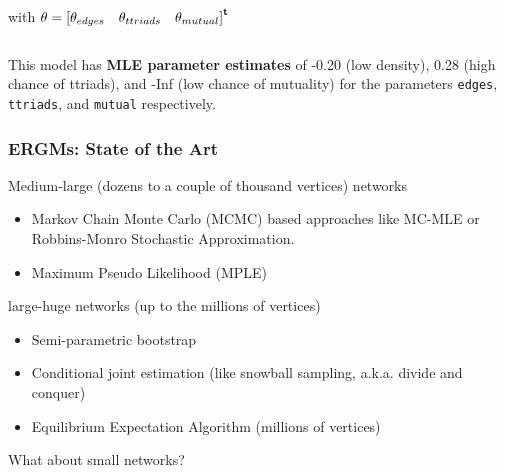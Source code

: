 \documentclass[aspectratio=169, 9pt]{beamer}\usepackage[]{graphicx}\usepackage[]{color}
\begin{document}
\begin{frame}[label=ergm-toyexample]
\begin{columns}[c]
\begin{column}[c]{.4\linewidth}
\normalsize

\noindent with $\theta = {[\theta_{edges}\quad \theta_{ttriads} \quad \theta_{mutual}]}^\mathbf{t}$

\end{column}

\end{columns}



\pause

\vspace{1cm}

This model has \textbf{MLE parameter estimates} of -0.20 (low density), 0.28 (high chance of ttriads), and -Inf (low chance of mutuality) for the parameters \texttt{edges}, \texttt{ttriads}, and \texttt{mutual} respectively.

\end{frame}

\begin{frame}[label=art]
\frametitle{ERGMs: State of the Art}
\pause
Medium-large (dozens to a couple of thousand vertices) networks

\begin{itemize}
\item Markov Chain Monte Carlo (MCMC) based approaches like MC-MLE or Robbins-Monro Stochastic Approximation. \hyperlink{mcmle}{}
\item Maximum Pseudo Likelihood (MPLE)
\end{itemize}\pause

large-huge networks (up to the millions of vertices)

\begin{itemize}
\item Semi-parametric bootstrap
\item Conditional joint estimation (like snowball sampling, a.k.a. divide and conquer)
\item Equilibrium Expectation Algorithm (millions of vertices)
\end{itemize}\pause

What about small networks?

\end{frame}
\end{document}

